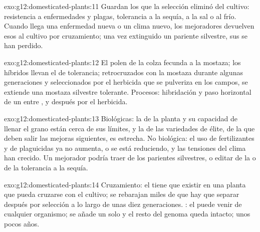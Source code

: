 \begin{solution}{exo:g12:domesticated-plants:11}
Guardan los  que la selección eliminó del cultivo: resistencia a
enfermedades y plagas, tolerancia a la sequía, a la sal o al frío.
Cuando llega una enfermedad nueva o un clima nuevo, los mejoradores
devuelven esos  al cultivo por cruzamiento; una vez extinguido un
pariente silvestre, sus  se han perdido.
\end{solution}

\begin{solution}{exo:g12:domesticated-plants:12}
El polen de la colza fecunda a la mostaza; los híbridos llevan el 
de tolerancia; retrocruzados con la mostaza durante algunas
generaciones y seleccionados por el herbicida que se pulveriza en los
campos, se extiende una mostaza silvestre tolerante. Procesos:
hibridación y paso horizontal de un  entre , y después
 por el herbicida.
\end{solution}

\begin{solution}{exo:g12:domesticated-plants:13}
Biológicas: la  de la planta y su capacidad de llenar el
grano están cerca de sus límites, y la  de las
variedades de élite, de la que deben salir las mejoras siguientes, es
estrecha. No biológica: el uso de fertilizantes y de plaguicidas ya no
aumenta, o se está reduciendo, y las tensiones del clima han crecido.
Un mejorador podría traer  de los parientes silvestres, o editar
 de la  o de la tolerancia a la sequía.
\end{solution}

\begin{solution}{exo:g12:domesticated-plants:14}
Cruzamiento: el  tiene que existir en una planta que pueda
cruzarse con el cultivo; se rebarajan miles de  que hay que
separar después por selección a lo largo de unas diez generaciones.
: el  puede venir de cualquier organismo; se añade un
solo  y el resto del genoma queda intacto; unos pocos años.
\end{solution}

